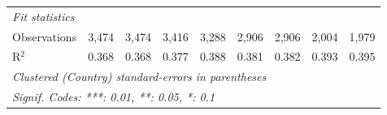 \begin{tabular}{lcccccccc}
   \midrule \emph{Fit statistics}\\
   Observations                                                                    & 3,474        & 3,474        & 3,416        & 3,288        & 2,906        & 2,906        & 2,004   & 1,979\\  
   R$^2$                                                                           & 0.368        & 0.368        & 0.377        & 0.388        & 0.381        & 0.382        & 0.393   & 0.395\\  
   \midrule
   \multicolumn{9}{l}{\emph{Clustered (Country) standard-errors in parentheses}}\\
   \multicolumn{9}{l}{\emph{Signif. Codes: ***: 0.01, **: 0.05, *: 0.1}}\\
\end{tabular}
\par\endgroup


